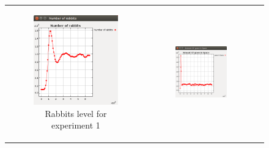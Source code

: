 \documentclass[11pt]{article}
\begin{document}
\begin{figure}
\begin{tabular}{c c c}
\begin{subfigure}[b]{0.3\textwidth}
        \includegraphics[width=\textwidth]{experiment/1/Rabbits.png}
        \caption{\label{img:rabbits1} Rabbits level for experiment 1}
    \end{subfigure} &
    \begin{subfigure}[b]{0.3\textwidth}
        \includegraphics[width=\textwidth]{experiment/3/Grass.png}

\end{subfigure}
\end{tabular}
\end{figure}
\end{document}

